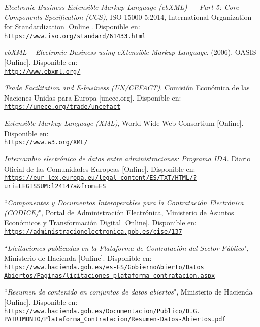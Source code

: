 \begin{thebibliography}{X}
    		\textit{Electronic Business Extensible Markup Language (ebXML) — Part 5: Core Components Specification (CCS)}, ISO 15000-5:2014, International Organization for Standardization [Online]. Disponible en:
            \\ \texttt{\url{https://www.iso.org/standard/61433.html}}
            
           \textit{ebXML – Electronic Business using eXtensible Markup Language}. (2006). OASIS [Online]. Disponible en:
            \\ \texttt{\url{http://www.ebxml.org/}}
            
           \textit{Trade Facilitation and E-business (UN/CEFACT)}. Comisión Económica de las Naciones Unidas para Europa [unece.org]. Disponible en:
            \\ \texttt{\url{https://unece.org/trade/uncefact}}
            
            \textit{Extensible Markup Language (XML)}, World Wide Web Consortium [Online]. Disponible en:
            \\ \texttt{\url{https://www.w3.org/XML/}}
            
            \textit{Intercambio electrónico de datos entre administraciones: Programa IDA}. Diario Oficial de las Comunidades Europeas [Online]. Disponible en:
            \\ \texttt{\url{https://eur-lex.europa.eu/legal-content/ES/TXT/HTML/?uri=LEGISSUM:l24147a&from=ES}}
            
            ``\textit{Componentes y Documentos Interoperables para la Contratación Electrónica (CODICE)}", Portal de Administración Electrónica,
            Ministerio de Asuntos Económicos y Transformación Digital [Online]. Disponible en:
        \\ \texttt{\url{https://administracionelectronica.gob.es/cise/137}}
            
            ``\textit{Licitaciones publicadas en la Plataforma de Contratación del Sector Público}", Ministerio de Hacienda [Online]. Disponible en:
            \\ \texttt{\url{https://www.hacienda.gob.es/es-ES/GobiernoAbierto/Datos Abiertos/Paginas/licitaciones_plataforma_contratacion.aspx}}
            
           ``\textit{Resumen de contenido en conjuntos de datos abiertos}", Ministerio de Hacienda [Online]. Disponible en:     
             \\ \texttt{\url{https://www.hacienda.gob.es/Documentacion/Publico/D.G. PATRIMONIO/Plataforma_Contratacion/Resumen-Datos-Abiertos.pdf}}
            

\end{thebibliography}

